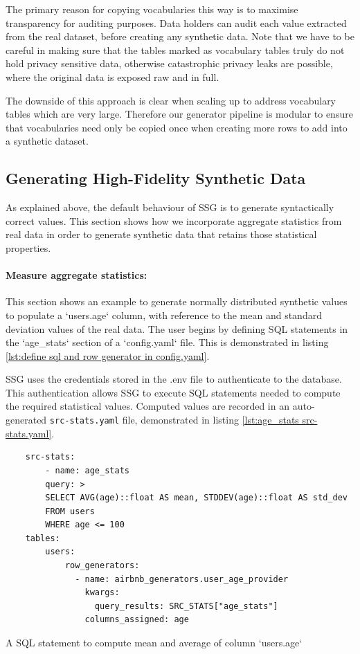 \documentclass[11pt]{article}
\begin{document}
The primary reason for copying vocabularies this way is to maximise transparency for auditing purposes. Data holders can audit each value extracted from the real dataset, before creating any synthetic data. Note that we have to be careful in making sure that the tables marked as vocabulary tables truly do not hold privacy sensitive data, otherwise catastrophic privacy leaks are possible, where the original data is exposed raw and in full. 

The downside of this approach is clear when scaling up to address vocabulary tables which are very large. Therefore our generator pipeline is modular to ensure that vocabularies need only be copied once when creating more rows to add into a synthetic dataset. 

\subsection{Generating High-Fidelity Synthetic Data}

As explained above, the default behaviour of SSG is to generate syntactically correct values. This section shows how we incorporate aggregate statistics from real data in order to generate synthetic data that retains those statistical properties. 

\paragraph{Measure aggregate statistics:}
This section shows an example to generate normally distributed synthetic values to populate a `users.age` column, with reference to the mean and standard deviation values of the real data. The user begins by defining SQL statements in the `age\_stats` section of a `config.yaml` file. This is demonstrated in listing \ref{lst:define sql and row generator in config.yaml}. 

SSG uses the credentials stored in the .env file to authenticate to the database. This authentication allows SSG to execute SQL statements needed to compute the required statistical values. Computed values are recorded in an auto-generated \texttt{src-stats.yaml} file, demonstrated in listing \ref{lst:age_stats src-stats.yaml}. 

\begin{listing}[H]
\begin{verbatim}
    src-stats:
        - name: age_stats
        query: >
        SELECT AVG(age)::float AS mean, STDDEV(age)::float AS std_dev
        FROM users
        WHERE age <= 100
    tables:
        users:
            row_generators:
              - name: airbnb_generators.user_age_provider
                kwargs:
                  query_results: SRC_STATS["age_stats"]
                columns_assigned: age
\end{verbatim}
\caption{A SQL statement to compute mean and average of column `users.age` }
\label{lst:define sql and row generator in config.yaml}
\end{listing}
\end{document}

